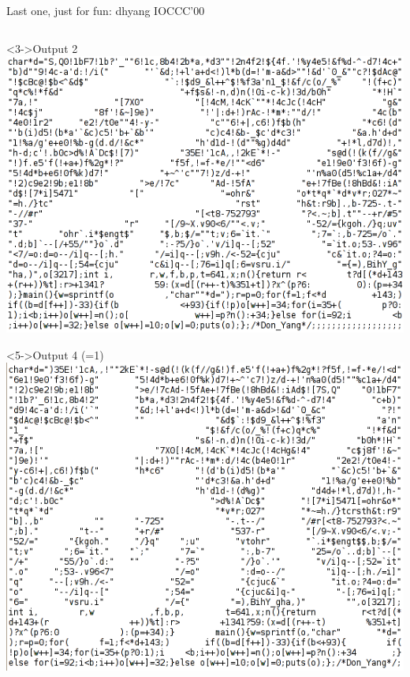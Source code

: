 \begin{frame}[t]{Last one, just for fun: dhyang IOCCC'00}
\begin{columns}
    \begin{column}{.3\linewidth}\vspace{-\baselineskip}
      \begin{block}<3->{Output 2}\medskip
        \includegraphics[width=\linewidth]{img/dhyang3.png}        
      \end{block}
      \begin{block}<5->{Output 4 (=1)}\medskip
        \includegraphics[width=\linewidth]{img/dhyang2.png}        
      \end{block}
    \end{column}      
  \end{columns}
\end{frame}

